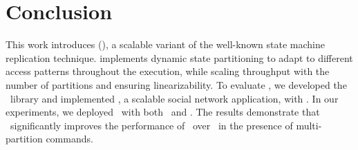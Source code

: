 \section{Conclusion}
\label{sec:conclusion}

This work introduces \dssmrlong{} (\dssmr), a scalable variant of the well-known
state machine replication technique. \dssmr{} implements dynamic state
partitioning to adapt to different access patterns throughout the execution,
while scaling throughput with the number of partitions and ensuring
linearizability. To evaluate \dssmr{}, we developed the \libname\ library and
implemented \appname{}, a scalable social network application, with \libname{}.
In our experiments, we deployed \appname\ with both \dssmr\ and \ssmr{}.
The results demonstrate that \dssmr\ significantly improves the performance of
\appname\ over \ssmr\ in the presence of multi-partition commands.


